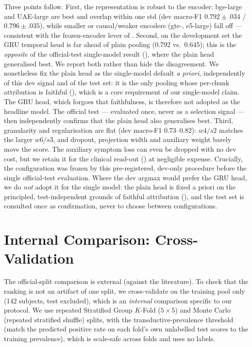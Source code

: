 \documentclass[conference]{IEEEtran}
\begin{document}
Three points follow. First, the representation is robust to the encoder: bge-large
and UAE-large are best and overlap within one std (dev macro-F1
$0.792\!\pm\!.034$ / $0.796\!\pm\!.035$), while smaller or causal/weaker encoders
(gte-, e5-large) fall off --- consistent with the frozen-encoder lever of
. Second, on the development set the
GRU temporal head is far ahead of plain pooling (0.792 vs.\ 0.645); this is the
\emph{opposite} of the official-test single-model result (),
where the plain head generalised best. We report both rather than hide the
disagreement. We nonetheless fix the plain head as the single-model default
\emph{a priori}, independently of this dev signal and of the test set: it is the
only pooling whose per-chunk attribution is faithful
(), which is a core requirement of our single-model claim.
The GRU head, which forgoes that faithfulness, is therefore not adopted as the
headline model. The official test --- evaluated
once, never as a selection signal --- then independently confirms that the plain
head also generalises best. Third, granularity and
regularisation are flat (dev macro-F1 0.73--0.82): $w4/s2$ matches the larger
$w6/s3$, and dropout, projection width and auxiliary weight barely move the
score. The auxiliary symptom loss can even be dropped with no dev cost, but we
retain it for the clinical read-out () at negligible
expense. Crucially, the configuration was frozen by this pre-registered,
dev-only procedure before the single official-test evaluation. Where the dev
argmax would prefer the GRU head, we do \emph{not} adopt it for the single model:
the plain head is fixed a priori on the principled, test-independent grounds of
faithful attribution (), and the test set is consulted once
as confirmation, never to choose between configurations.

\section{Internal Comparison: Cross-Validation}
\label{sec:internal}

The official-split comparison is external (against the literature). To check
that the ranking is not an artifact of one split, we cross-validate on the
training pool only (142 subjects, test excluded), which is an \emph{internal}
comparison specific to our protocol. We use repeated Stratified Group $K$-Fold
($5\times5$) and Monte Carlo (repeated stratified shuffle) splits, with the
transductive-prevalence threshold (match the predicted positive rate on each
fold's own unlabelled test scores to the training prevalence), which is
scale-safe across folds and uses no labels.
\end{document}

